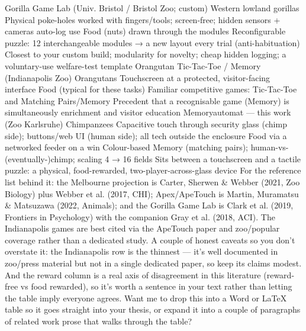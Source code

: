 Gorilla Game Lab (Univ. Bristol / Bristol Zoo; custom)	Western lowland gorillas	Physical poke-holes worked with fingers/tools; screen-free; hidden sensors + cameras auto-log use	Food (nuts) drawn through the modules	Reconfigurable puzzle: 12 interchangeable modules → a new layout every trial (anti-habituation)	Closest to your custom build; modularity for novelty; cheap hidden logging; a voluntary-use welfare-test template
Orangutan Tic-Tac-Toe / Memory (Indianapolis Zoo)	Orangutans	Touchscreen at a protected, visitor-facing interface	Food (typical for these tasks)	Familiar competitive games: Tic-Tac-Toe and Matching Pairs/Memory	Precedent that a recognisable game (Memory) is simultaneously enrichment and visitor education
Memoryautomat — this work (Zoo Karlsruhe)	Chimpanzees	Capacitive touch through security glass (chimp side); buttons/web UI (human side); all tech outside the enclosure	Food via a networked feeder on a win	Colour-based Memory (matching pairs); human-vs-(eventually-)chimp; scaling 4 → 16 fields	Sits between a touchscreen and a tactile puzzle: a physical, food-rewarded, two-player-across-glass device
For the reference list behind it: the Melbourne projection is Carter, Sherwen & Webber (2021, Zoo Biology) plus Webber et al. (2017, CHI); Apex/ApeTouch is Martin, Muramatsu & Matsuzawa (2022, Animals); and the Gorilla Game Lab is Clark et al. (2019, Frontiers in Psychology) with the companion Gray et al. (2018, ACI). The Indianapolis games are best cited via the ApeTouch paper and zoo/popular coverage rather than a dedicated study.
A couple of honest caveats so you don't overstate it: the Indianapolis row is the thinnest — it's well documented in zoo/press material but not in a single dedicated paper, so keep its claims modest. And the reward column is a real axis of disagreement in this literature (reward-free vs food rewarded), so it's worth a sentence in your text rather than letting the table imply everyone agrees.
Want me to drop this into a Word or LaTeX table so it goes straight into your thesis, or expand it into a couple of paragraphs of related work prose that walks through the table?
 
 
 

